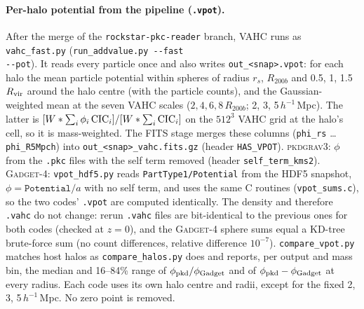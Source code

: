 \documentclass[11pt,a4paper]{article}
\newcommand{\pkd}{\textsc{pkdgrav3}}
\newcommand{\gad}{\textsc{Gadget-4}}
\newcommand{\fp}[1]{\nolinkurl{#1}}
\newcommand{\Mpch}{$h^{-1}$\,Mpc}
\begin{document}
\paragraph{Per-halo potential from the pipeline (\texttt{.vpot}).}
\label{sec:vpotm}
After the merge of the \fp{rockstar-pkc-reader} branch, VAHC runs as \fp{vahc_fast.py} (\fp{run_addvalue.py --fast
--pot}). It reads every particle once and also writes \fp{out_<snap>.vpot}: for each halo the mean particle potential
within spheres of radius $r_s$, $R_{200b}$ and 0.5, 1, 1.5\,$R_{\rm vir}$ around the halo centre (with the particle
counts), and the Gaussian-weighted mean at the seven VAHC scales ($2, 4, 6, 8\,R_{200b}$; 2, 3, 5\,\Mpch). The latter
is $[W\ast\sum_i\phi_i\,{\rm CIC}_i]/[W\ast\sum_i{\rm CIC}_i]$ on the $512^3$ VAHC grid at the halo's cell, so it is
mass-weighted. The FITS stage merges these columns (\texttt{phi\_rs} \ldots{} \texttt{phi\_R5Mpch}) into
\fp{out_<snap>_vahc.fits.gz} (header \texttt{HAS\_VPOT}). \pkd{}: $\phi$ from the \texttt{.pkc} files with the self
term removed (header \texttt{self\_term\_kms2}). \gad{}: \fp{vpot_hdf5.py} reads \texttt{PartType1/Potential} from
the HDF5 snapshot, $\phi = \texttt{Potential}/a$ with no self term, and uses the same C routines
(\fp{vpot_sums.c}), so the two codes' \texttt{.vpot} are computed identically. The density and therefore
\fp{.vahc} do not change: rerun \fp{.vahc} files are bit-identical to the previous ones for both codes (checked at $z=0$), and
the \gad{} sphere sums equal a KD-tree brute-force sum (no count differences, relative difference $10^{-7}$).
\fp{compare_vpot.py} matches host halos as \fp{compare_halos.py} does and reports, per output and mass bin, the
median and 16--84\% range of $\phi_{\rm pkd}/\phi_{\rm Gadget}$ and of $\phi_{\rm pkd}-\phi_{\rm Gadget}$ at every
radius. Each code uses its own halo centre and radii, except for the fixed 2, 3, 5\,\Mpch{}. No zero point is removed.
\end{document}
